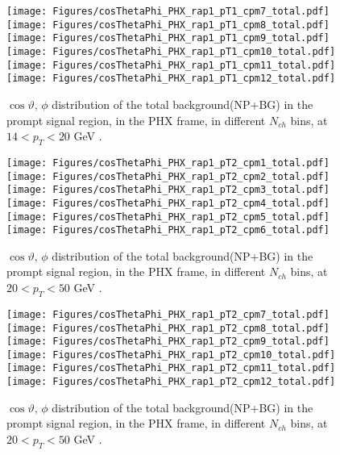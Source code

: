 \documentclass[12pt]{article}
\begin{document}
\begin{figure}[htbp]
\centering
\texttt{[image: Figures/cosThetaPhi\_PHX\_rap1\_pT1\_cpm7\_total.pdf]}
\texttt{[image: Figures/cosThetaPhi\_PHX\_rap1\_pT1\_cpm8\_total.pdf]}
\texttt{[image: Figures/cosThetaPhi\_PHX\_rap1\_pT1\_cpm9\_total.pdf]}
\texttt{[image: Figures/cosThetaPhi\_PHX\_rap1\_pT1\_cpm10\_total.pdf]}
\texttt{[image: Figures/cosThetaPhi\_PHX\_rap1\_pT1\_cpm11\_total.pdf]}
\texttt{[image: Figures/cosThetaPhi\_PHX\_rap1\_pT1\_cpm12\_total.pdf]}
\caption{$\cos\vartheta,\,\phi$ distribution of the total background(NP+BG) in the prompt signal region, 
	in the PHX frame, in different $N_{ch}$ bins, at $14 < p_{T} < 20$ GeV .}
\end{figure}
\clearpage

\begin{figure}[htbp]
\centering
\texttt{[image: Figures/cosThetaPhi\_PHX\_rap1\_pT2\_cpm1\_total.pdf]}
\texttt{[image: Figures/cosThetaPhi\_PHX\_rap1\_pT2\_cpm2\_total.pdf]}
\texttt{[image: Figures/cosThetaPhi\_PHX\_rap1\_pT2\_cpm3\_total.pdf]}
\texttt{[image: Figures/cosThetaPhi\_PHX\_rap1\_pT2\_cpm4\_total.pdf]}
\texttt{[image: Figures/cosThetaPhi\_PHX\_rap1\_pT2\_cpm5\_total.pdf]}
\texttt{[image: Figures/cosThetaPhi\_PHX\_rap1\_pT2\_cpm6\_total.pdf]}
\caption{$\cos\vartheta,\,\phi$ distribution of the total background(NP+BG) in the prompt signal region, 
	in the PHX frame, in different $N_{ch}$ bins, at $20 < p_{T} < 50$ GeV .}
\end{figure}
\clearpage

\begin{figure}[htbp]
\centering
\texttt{[image: Figures/cosThetaPhi\_PHX\_rap1\_pT2\_cpm7\_total.pdf]}
\texttt{[image: Figures/cosThetaPhi\_PHX\_rap1\_pT2\_cpm8\_total.pdf]}
\texttt{[image: Figures/cosThetaPhi\_PHX\_rap1\_pT2\_cpm9\_total.pdf]}
\texttt{[image: Figures/cosThetaPhi\_PHX\_rap1\_pT2\_cpm10\_total.pdf]}
\texttt{[image: Figures/cosThetaPhi\_PHX\_rap1\_pT2\_cpm11\_total.pdf]}
\texttt{[image: Figures/cosThetaPhi\_PHX\_rap1\_pT2\_cpm12\_total.pdf]}
\caption{$\cos\vartheta,\,\phi$ distribution of the total background(NP+BG) in the prompt signal region, 
	in the PHX frame, in different $N_{ch}$ bins, at $20 < p_{T} < 50$ GeV .}
\end{figure}
\clearpage
\end{document}
